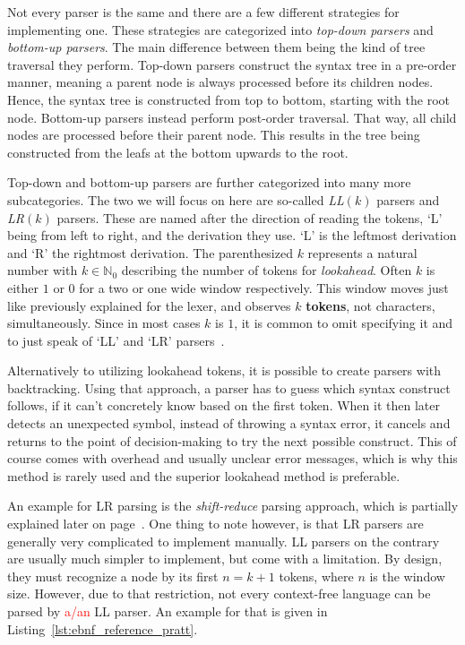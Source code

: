Not every parser is the same and there are a few different strategies for implementing one.
These strategies are categorized into \emph{top-down parsers} and \emph{bottom-up parsers}.
The main difference between them being the kind of tree traversal they perform.
Top-down parsers construct the syntax tree in a pre-order manner, meaning a parent node is always processed before its children nodes.
Hence, the syntax tree is constructed from top to bottom, starting with the root node.
Bottom-up parsers instead perform post-order traversal.
That way, all child nodes are processed before their parent node.
This results in the tree being constructed from the leafs at the bottom upwards to the root.

Top-down and bottom-up parsers are further categorized into many more subcategories.
The two we will focus on here are so-called \emph{LL$(k)$} parsers and \emph{LR$(k)$} parsers.
These are named after the direction of reading the tokens, `L' being from left to right, and the derivation they use.
`L' is the leftmost derivation and `R' the rightmost derivation.
The parenthesized $k$ represents a natural number with $k\in\mathbb{N}_0$ describing the number of tokens for \emph{lookahead}.
Often $k$ is either $1$ or $0$ for a two or one wide window respectively.
This window moves just like previously explained for the lexer, and observes $k$ \textbf{tokens}, not characters, simultaneously.
Since in most cases $k$ is $1$, it is common to omit specifying it and to just speak of `LL' and `LR' parsers~\cite[pp.86-88]{Watson2017}.

Alternatively to utilizing lookahead tokens, it is possible to create parsers with backtracking.
Using that approach, a parser has to guess which syntax construct follows, if it can't concretely know based on the first token.
When it then later detects an unexpected symbol, instead of throwing a syntax error, it cancels and returns to the point of decision-making to try the next possible construct.
This of course comes with overhead and usually unclear error messages, which is why this method is rarely used and the superior lookahead method is preferable.

An example for LR parsing is the \emph{shift-reduce} parsing approach, which is partially explained later on page~\pageref{sec:parser_generators}.
One thing to note however, is that LR parsers are generally very complicated to implement manually.
LL parsers on the contrary are usually much simpler to implement, but come with a limitation.
By design, they must recognize a node by its first $n=k+1$ tokens, where $n$ is the window size.
However, due to that restriction, not every context-free language can be parsed by \textcolor{red}{a/an} LL parser.
An example for that is given in Listing~\ref{lst:ebnf_reference_pratt}.

